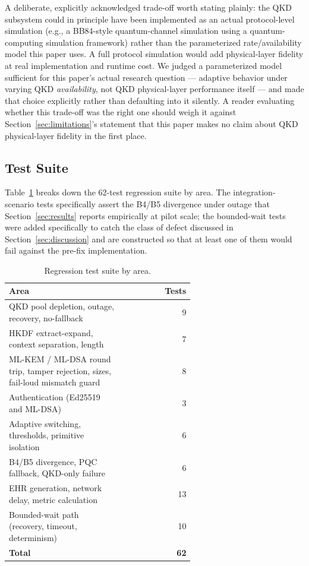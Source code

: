 \documentclass[journal]{IEEEtran}
\begin{document}
A deliberate, explicitly acknowledged trade-off worth stating plainly: the QKD subsystem could in principle have been implemented as an actual protocol-level simulation (e.g., a BB84-style quantum-channel simulation using a quantum-computing simulation framework) rather than the parameterized rate/availability model this paper uses. A full protocol simulation would add physical-layer fidelity at real implementation and runtime cost. We judged a parameterized model sufficient for this paper's actual research question --- adaptive behavior under varying QKD \emph{availability}, not QKD physical-layer performance itself --- and made that choice explicitly rather than defaulting into it silently. A reader evaluating whether this trade-off was the right one should weigh it against Section~\ref{sec:limitations}'s statement that this paper makes no claim about QKD physical-layer fidelity in the first place.

\subsection{Test Suite}
\label{sec:testsuite}
Table~\ref{tab:tests} breaks down the 62-test regression suite by area. The integration-scenario tests specifically assert the B4/B5 divergence under outage that Section~\ref{sec:results} reports empirically at pilot scale; the bounded-wait tests were added specifically to catch the class of defect discussed in Section~\ref{sec:discussion} and are constructed so that at least one of them would fail against the pre-fix implementation.

\begin{table}[t]
\centering
\caption{Regression test suite by area.}
\label{tab:tests}
\small
\begin{tabular}{@{}p{0.62\linewidth}r@{}}
\toprule
Area & Tests \\
\midrule
QKD pool depletion, outage, recovery, no-fallback & 9 \\
HKDF extract-expand, context separation, length & 7 \\
ML-KEM / ML-DSA round trip, tamper rejection, sizes, fail-loud mismatch guard & 8 \\
Authentication (Ed25519 and ML-DSA) & 3 \\
Adaptive switching, thresholds, primitive isolation & 6 \\
B4/B5 divergence, PQC fallback, QKD-only failure & 6 \\
EHR generation, network delay, metric calculation & 13 \\
Bounded-wait path (recovery, timeout, determinism) & 10 \\
\midrule
\textbf{Total} & \textbf{62} \\
\bottomrule
\end{tabular}
\end{table}
\end{document}
